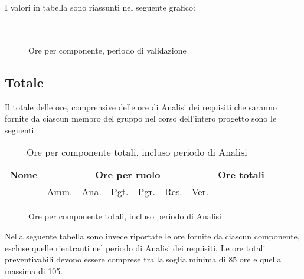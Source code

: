 I valori in tabella sono riassunti nel seguente grafico: \\ \\ \\
\begin{figure}[H]
\caption{Ore per componente, periodo di validazione}
\end{figure}

\pagebreak
\subsection{Totale}

Il totale delle ore, comprensive delle ore di Analisi dei requisiti che saranno fornite da ciascun membro del gruppo nel corso dell'intero progetto sono le seguenti:

\begin{table}[H]
\centering
\begin{tabular}{lccccccc}
\toprule 
    \textbf{Nome}  & \multicolumn{6}{c}{\textbf{Ore per ruolo}} & \textbf{Ore totali}\\
     & Amm. & Ana. & Pgt. & Pgr. & Res. & Ver. \\
    \midrule

		 	

    \bottomrule
\end{tabular}
\caption{Ore per componente totali, incluso periodo di Analisi}
\end{table}


\begin{figure}[H]
\caption{Ore per componente totali, incluso periodo di Analisi}
\end{figure}

Nella seguente tabella sono invece riportate le ore fornite da ciascun componente, escluse quelle rientranti nel periodo di Analisi dei requisiti. 
Le ore totali preventivabili devono essere comprese tra la soglia minima di 85 ore e quella massima di 105.

